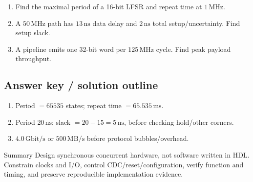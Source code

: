 \documentclass[10pt,letterpaper]{article}
\begin{document}
\begin{enumerate}
  \item Find the maximal period of a 16-bit LFSR and repeat time at $1\,\mathrm{MHz}$.
  \item A $50\,\mathrm{MHz}$ path has $13\,\mathrm{ns}$ data delay and $2\,\mathrm{ns}$ total setup/uncertainty. Find setup slack.
  \item A pipeline emits one 32-bit word per $125\,\mathrm{MHz}$ cycle. Find peak payload throughput.
\end{enumerate}\subsection{Answer key / solution outline}
\begin{enumerate}
  \item Period $=65535$ states; repeat time $=65.535\,\mathrm{ms}$.
  \item Period $20\,\mathrm{ns}$; slack $=20-15=5\,\mathrm{ns}$, before checking hold/other corners.
  \item $4.0\,\mathrm{Gbit/s}$ or $500\,\mathrm{MB/s}$ before protocol bubbles/overhead.
\end{enumerate}\begin{CornellSummaryBox}{Summary}
Design synchronous concurrent hardware, not software written in HDL. Constrain clocks and I/O, control CDC/reset/configuration, verify function and timing, and preserve reproducible implementation evidence.
\end{CornellSummaryBox}
\end{document}
